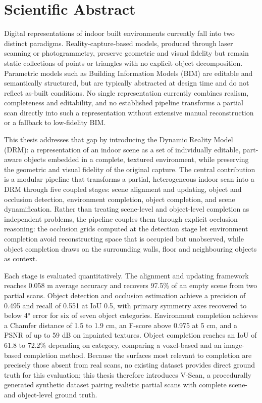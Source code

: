 \chapter*{Scientific Abstract}                                 \label{ch:abstract}

Digital representations of indoor built environments currently fall into two distinct paradigms. Reality-capture-based models, produced through laser scanning or photogrammetry, preserve geometric and visual fidelity but remain static collections of points or triangles with no explicit object decomposition. Parametric models such as Building Information Models (BIM) are editable and semantically structured, but are typically abstracted at design time and do not reflect as-built conditions. No single representation currently combines realism, completeness and editability, and no established pipeline transforms a partial scan directly into such a representation without extensive manual reconstruction or a fallback to low-fidelity BIM.

This thesis addresses that gap by introducing the Dynamic Reality Model (DRM): a representation of an indoor scene as a set of individually editable, part-aware objects embedded in a complete, textured environment, while preserving the geometric and visual fidelity of the original capture. The central contribution is a modular pipeline that transforms a partial, heterogeneous indoor scan into a DRM through five coupled stages: scene alignment and updating, object and occlusion detection, environment completion, object completion, and scene dynamification. Rather than treating scene-level and object-level completion as independent problems, the pipeline couples them through explicit occlusion reasoning: the occlusion grids computed at the detection stage let environment completion avoid reconstructing space that is occupied but unobserved, while object completion draws on the surrounding walls, floor and neighbouring objects as context.

Each stage is evaluated quantitatively. The alignment and updating framework reaches 0.058 m average accuracy and recovers 97.5\% of an empty scene from two partial scans. Object detection and occlusion estimation achieve a precision of 0.495 and recall of 0.551 at IoU 0.5, with primary symmetry axes recovered to below 4° error for six of seven object categories. Environment completion achieves a Chamfer distance of 1.5 to 1.9 cm, an F-score above 0.975 at 5 cm, and a PSNR of up to 59 dB on inpainted textures. Object completion reaches an IoU of 61.8 to 72.2\% depending on category, comparing a voxel-based and an image-based completion method. Because the surfaces most relevant to completion are precisely those absent from real scans, no existing dataset provides direct ground truth for this evaluation; this thesis therefore introduces V-Scan, a procedurally generated synthetic dataset pairing realistic partial scans with complete scene- and object-level ground truth.

